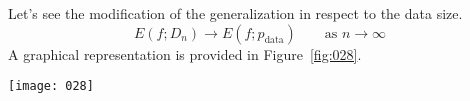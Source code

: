 \begin{example}
Let's see the modification of the generalization in respect to the data size.
\[E(f;D_n) \to E(f;p_{\text{data}}) \qquad \text{as } n \to \infty\]
A graphical representation is provided in Figure~\ref{fig:028}.

\begin{center}
    \texttt{[image: 028]}
    \label{fig:028}
\end{center}
\end{example}

\newpage
\begin{exercise}[topsep=20pt, itemsep=10pt]
\end{exercise}